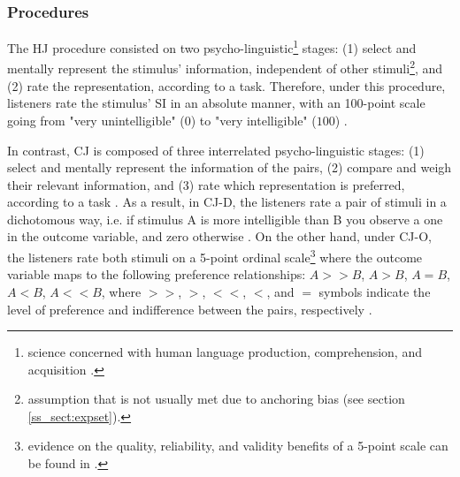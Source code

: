 \subsubsection{Procedures} \label{ss_sect:proc}
%
The HJ procedure consisted on two psycho-linguistic\footnote{science concerned with human language production, comprehension, and acquisition \citep{Levelt_1993}.} stages: (1) select and mentally represent the stimulus' information, independent of other stimuli\footnote{assumption that is not usually met due to anchoring bias (see section \ref{ss_sect:expset}).}, and (2) rate the representation, according to a task. Therefore, under this procedure, listeners rate the stimulus' SI in an absolute manner, with an 100-point scale going from "very unintelligible" ($0$) to "very intelligible" ($100$) \citep{Boonen_et_al_2021, Faes_et_al_2021}.

In contrast, CJ is composed of three interrelated psycho-linguistic stages: (1) select and mentally represent the information of the pairs, (2) compare and weigh their relevant information, and (3) rate which representation is preferred, according to a task \citep{vanDaal_2020}. As a result, in CJ-D, the listeners rate a pair of stimuli in a dichotomous way, i.e. if stimulus A is more intelligible than B you observe a one in the outcome variable, and zero otherwise \citep{Bradley_et_al_1952}. On the other hand, under CJ-O, the listeners rate both stimuli on a 5-point ordinal scale\footnote{evidence on the quality, reliability, and validity benefits of a 5-point scale can be found in \citet{Revilla_et_al_2014}.} where the outcome variable maps to the following preference relationships: $A>>B$, $A>B$, $A=B$, $A<B$, $A<<B$, where $>>$, $>$, $<<$, $<$, and $=$ symbols indicate the level of preference and indifference between the pairs, respectively \citep{Tutz_1986, Agresti_1992}.
%
%
